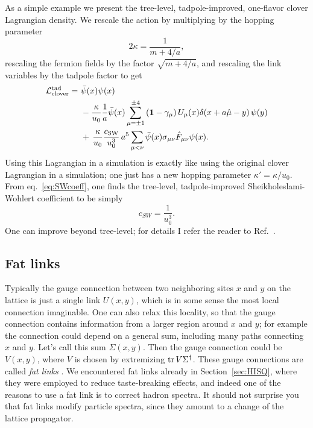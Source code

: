 As a simple example we present the tree-level, tadpole-improved, one-flavor
clover Lagrangian density. We rescale the action by multiplying by 
the hopping parameter
\begin{equation}
  2\kappa=\frac{1}{m+4/a},
\end{equation}
rescaling the fermion fields by the factor $\sqrt{m+4/a}$, and
rescaling the link variables by the tadpole factor to get
\begin{equation}\begin{aligned}
  \mathcal{L}_\text{clover}^\text{tad}=~&\bar{\psi}(x)\psi(x)\\
    &-\frac{\kappa}{u_0}\frac{1}{a}\bar{\psi}(x)
    \sum_{\mu=\pm1}^{\pm4}\left({\mathbf 1}-\gamma_\mu\right)U_\mu(x)
           \delta(x+a\hat{\mu}-y)\,\psi(y)\\
    &+\,\frac{\kappa}{u_0}\frac{c_\text{SW}}{u_0^3}
               \,a^5\sum_{\mu<\nu}\bar{\psi}(x)
                  \sigma_{\mu\nu}\hat{F}_{\mu\nu}\psi(x).
\end{aligned}\end{equation}
Using this Lagrangian in a simulation is exactly like using the original 
clover Lagrangian in a simulation; one just has a new hopping parameter
$\kappa'=\kappa/u_0$. From eq.~\eqref{eq:SWcoeff}, one finds the
tree-level, tadpole-improved Sheikholeslami-Wohlert coefficient to be
simply
\begin{equation}
  c_{SW}=\frac{1}{u_0^3}.
\end{equation}
One can improve beyond tree-level; for details I refer the reader
to Ref.~\cite{degrand_lattice_2006}.

\subsection{Fat links}

Typically the gauge connection between two neighboring sites $x$ and $y$
on the lattice is just a single link $U(x,y)$, which is in some sense the 
most local connection imaginable. One can also relax this locality, so that 
the gauge connection contains information from a larger region around 
$x$ and $y$; for example the connection could depend on a general sum, 
including many paths connecting $x$ and $y$. Let's call
this sum $\Sigma(x,y)$. Then the gauge connection could be $V(x,y)$,
where $V$ is chosen by extremizing $\tr V\Sigma^\dagger$. These gauge
connections are called {\it fat links} \cite{blum_improving_1997}. 
We encountered fat links
already in Section~\ref{sec:HISQ}, where they were employed to reduce
taste-breaking effects, and indeed one of the reasons to use a fat link
is to correct hadron spectra. It should not surprise you that fat links
modify particle spectra, since they amount to a change of the lattice 
propagator.


